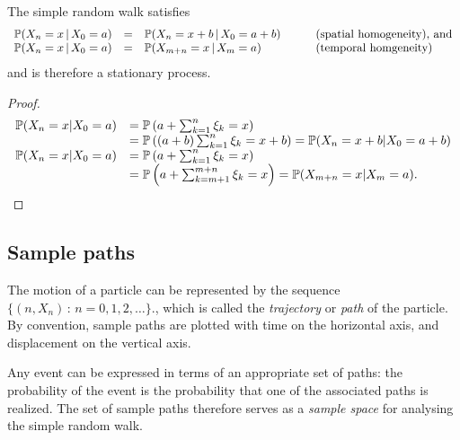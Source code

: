 \begin{lemma}
The simple random walk satisfies
\[
\begin{array}{lcll}
\mathbb{P}(X_n=x\,|\,X_0=a) 
	& = & \mathbb{P}(X_n=x+b\,|\,X_0=a+b) 	&\qquad\text{(spatial homogeneity), and} \\
\mathbb{P}(X_n=x\,|\,X_0=a) 
	& = & \mathbb{P}(X_{m+n}=x\,|\,X_m=a) 	&\qquad\text{(temporal homgeneity)}
\end{array}
\]
and is therefore a stationary process.
\begin{proof}
\[
\begin{array}{lll}
\mathbb{P}(X_n=x|X_0=a) 
	& = \mathbb{P}\left(a+\sum_{k=1}^n \xi_k = x\right) \\
	& = \mathbb{P}\left((a+b)\sum_{k=1}^n \xi_k = x+b\right) = \mathbb{P}(X_n=x+b|X_0=a+b) \\
\mathbb{P}(X_n=x|X_0=a) 
	& = \mathbb{P}\left(a+\sum_{k=1}^n \xi_k = x\right) \\
	& = \mathbb{P}\left(a+\sum_{k=m+1}^{m+n} \xi_k = x\right) = \mathbb{P}(X_{m+n}=x|X_m=a).
\end{array}
\]
\end{proof}
\end{lemma}

%

\subsection{Sample paths}
The motion of a particle can be represented by the sequence $\{(n,X_n)\,:\,n=0,1,2,\ldots\}$., which is called the \emph{trajectory} or \emph{path} of the particle. By convention, sample paths are plotted with time on the horizontal axis, and displacement on the vertical axis.

Any event can be expressed in terms of an appropriate set of paths: the probability of the event is the probability that one of the associated paths is realized. The set of sample paths therefore serves as a \emph{sample space} for analysing the simple random walk.

